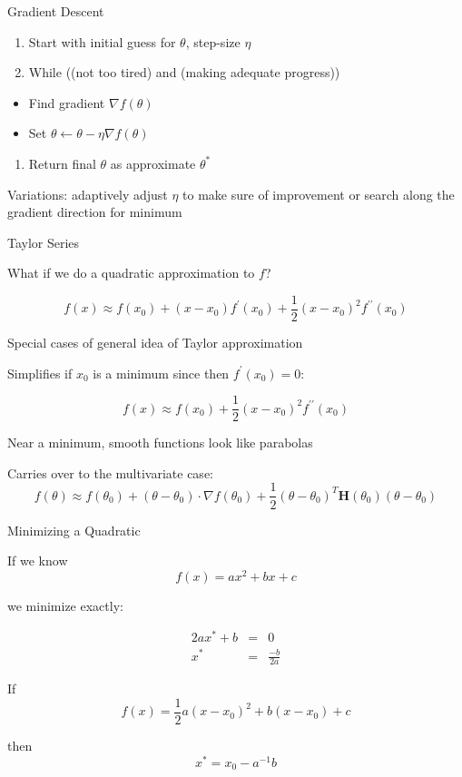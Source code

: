 \documentclass[8pt,ignorenonframetext,]{beamer}
\providecommand{\tightlist}{%
  \setlength{\itemsep}{0pt}\setlength{\parskip}{0pt}}
\begin{document}
\begin{frame}{Gradient Descent}

\begin{enumerate}
\def\labelenumi{\arabic{enumi}.}
\tightlist
\item
  Start with initial guess for \(\theta\), step-size \(\eta\)
\item
  While ((not too tired) and (making adequate progress))
\end{enumerate}

\begin{itemize}
\tightlist
\item
  Find gradient \(\nabla f(\theta)\)
\item
  Set \(\theta \leftarrow \theta - \eta \nabla f(\theta)\)
\end{itemize}

\begin{enumerate}
\def\labelenumi{\arabic{enumi}.}
\setcounter{enumi}{2}
\tightlist
\item
  Return final \(\theta\) as approximate \(\theta^*\)
\end{enumerate}

Variations: adaptively adjust \(\eta\) to make sure of improvement or
search along the gradient direction for minimum

\end{frame}

\begin{frame}{Taylor Series}

What if we do a quadratic approximation to \(f\)?

\[
f(x) \approx f(x_0) + (x-x_0)f^{\prime}(x_0) + \frac{1}{2}(x-x_0)^2
f^{\prime\prime}(x_0)
\]

Special cases of general idea of Taylor approximation

Simplifies if \(x_0\) is a minimum since then \(f^{\prime}(x_0) = 0\):

\[
f(x) \approx f(x_0) + \frac{1}{2}(x-x_0)^2 f^{\prime\prime}(x_0)
\]

Near a minimum, smooth functions look like parabolas

Carries over to the multivariate case: \[
f(\theta) \approx f(\theta_0) + (\theta-\theta_0) \cdot \nabla f(\theta_0) +
\frac{1}{2}(\theta-\theta_0)^T \mathbf{H}(\theta_0) (\theta-\theta_0)
\]

\end{frame}

\begin{frame}{Minimizing a Quadratic}

If we know \[
f(x) = ax^2 + bx + c
\]

we minimize exactly:

\[
\begin{eqnarray*}
2ax^* + b & = & 0\\
x^* & = & \frac{-b}{2a}
\end{eqnarray*}
\]

If \[
f(x) = \frac{1}{2}a (x-x_0)^2 + b(x-x_0) + c
\]

then \[
x^* = x_0 - a^{-1}b
\]

\end{frame}
\end{document}
